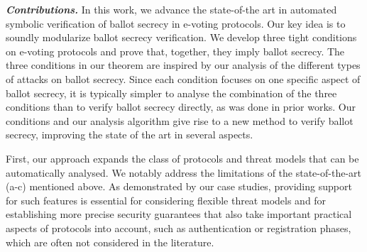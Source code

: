 

\noindent
\textbf{\em Contributions.}
In this work, we advance the state-of-the art in automated
symbolic verification of ballot secrecy in e-voting protocols.
%
Our key idea is to soundly modularize ballot secrecy verification.
%
We develop three tight conditions on e-voting protocols
and prove that, together, they imply ballot secrecy. The three
conditions in our theorem are inspired by our analysis of the
different types of attacks on ballot secrecy.  Since each condition
focuses on one specific aspect of ballot secrecy, it is typically
simpler to analyse the combination of the three conditions than to verify
ballot secrecy directly, as was done in prior works.
Our conditions and our analysis algorithm 
give rise to a new method to verify ballot secrecy, improving the
state of the art in several aspects.

First, our approach expands the class of protocols
and threat models that can be automatically analysed.
We notably address the limitations of the state-of-the-art (a-c) mentioned above.
%
As demonstrated by our case studies,
providing support for such features is essential for considering 
flexible threat models and for establishing more precise security
guarantees that also take important practical aspects of
protocols into account, such as authentication or registration phases,
which are often not considered in the literature.

